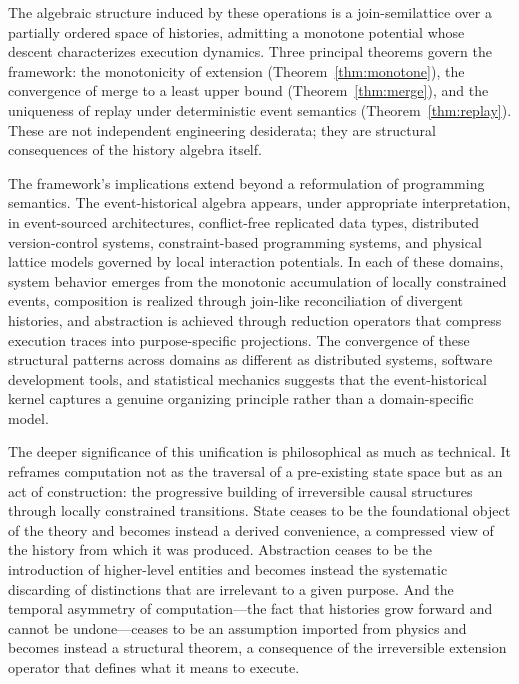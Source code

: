 \documentclass[12pt]{article}
\begin{document}
The algebraic structure induced by these operations is a join-semilattice over a partially ordered space of histories, admitting a monotone potential whose descent characterizes execution dynamics. Three principal theorems govern the framework: the monotonicity of extension (Theorem~\ref{thm:monotone}), the convergence of merge to a least upper bound (Theorem~\ref{thm:merge}), and the uniqueness of replay under deterministic event semantics (Theorem~\ref{thm:replay}). These are not independent engineering desiderata; they are structural consequences of the history algebra itself.

The framework's implications extend beyond a reformulation of programming semantics. The event-historical algebra appears, under appropriate interpretation, in event-sourced architectures, conflict-free replicated data types, distributed version-control systems, constraint-based programming systems, and physical lattice models governed by local interaction potentials. In each of these domains, system behavior emerges from the monotonic accumulation of locally constrained events, composition is realized through join-like reconciliation of divergent histories, and abstraction is achieved through reduction operators that compress execution traces into purpose-specific projections. The convergence of these structural patterns across domains as different as distributed systems, software development tools, and statistical mechanics suggests that the event-historical kernel captures a genuine organizing principle rather than a domain-specific model.

The deeper significance of this unification is philosophical as much as technical. It reframes computation not as the traversal of a pre-existing state space but as an act of construction: the progressive building of irreversible causal structures through locally constrained transitions. State ceases to be the foundational object of the theory and becomes instead a derived convenience, a compressed view of the history from which it was produced. Abstraction ceases to be the introduction of higher-level entities and becomes instead the systematic discarding of distinctions that are irrelevant to a given purpose. And the temporal asymmetry of computation---the fact that histories grow forward and cannot be undone---ceases to be an assumption imported from physics and becomes instead a structural theorem, a consequence of the irreversible extension operator that defines what it means to execute.

\newpage
\end{document}
